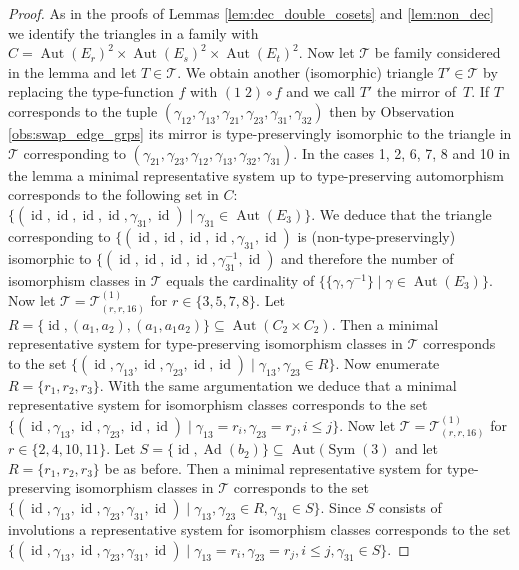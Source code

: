 \documentclass[dvipsnames]{article}
\theoremstyle{definition}
\theoremstyle{remark}
\DeclareMathOperator{\Sym}{Sym}
\DeclareMathOperator{\Aut}{Aut}
\DeclareMathOperator{\id}{id}
\DeclareMathOperator{\Ad}{Ad}
\begin{document}
    \begin{proof}
        As in the proofs of Lemmas \ref{lem:dec_double_cosets} and \ref{lem:non_dec} we identify the triangles in a family with
        $C = \Aut(E_r)^2 \times \Aut(E_s)^2 \times \Aut(E_t)^2$. 
        Now let $\mathcal T$ be family considered in the lemma and let $T \in \mathcal T$.
        We obtain another (isomorphic) triangle $T' \in \mathcal T$ by replacing the type-function $f$ with $(1\;2)\circ f$ and we call $T'$ the mirror of~$T$. 
        If $T$ corresponds to the tuple $(\gamma_{12},\allowbreak \gamma_{13},\allowbreak \gamma_{21},\allowbreak \gamma_{23},\allowbreak \gamma_{31},\allowbreak \gamma_{32})$ then by Observation \ref{obs:swap_edge_grps} its mirror is type-preservingly isomorphic to the triangle in $\mathcal T$ corresponding to $(\gamma_{21},\allowbreak \gamma_{23},\allowbreak \gamma_{12},\allowbreak \gamma_{13},\allowbreak \gamma_{32},\allowbreak \gamma_{31})$.
        In the cases 1, 2, 6, 7, 8 and 10 in the lemma a minimal representative system up to type-preserving automorphism corresponds to the following set in $C$: 
        $\{(\id,\id,\id,\id,\gamma_{31},\id) \mid \gamma_{31} \in \Aut(E_3)\}$.
        We deduce that the triangle corresponding to $\{(\id,\id,\id,\id,\gamma_{31},\id)$ is (non-type-preservingly) isomorphic to $\{(\id,\id,\id,\id,\gamma_{31}^{-1},\id)$ and therefore the number of isomorphism classes in $\mathcal T$ equals the cardinality of $\{\{\gamma, \gamma^{-1}\} \mid \gamma \in \Aut(E_3)\}$.
        Now let $\mathcal T = \mathcal T^{(1)}_{(r,r,16)}$ for $r \in \{3,5,7,8\}$. Let $R = \{\id, (a_1, a_2), (a_1, a_1a_2)\} \subseteq \Aut(C_2\times C_2)$. Then a minimal representative system for type-preserving isomorphism classes in $\mathcal T$ corresponds to the set
        $\{(\id,\gamma_{13},\id,\gamma_{23},\id,\id) \mid \gamma_{13}, \gamma_{23} \in R\}$.
        Now enumerate $R = \{r_1, r_2, r_3\}$. With the same argumentation we deduce that a minimal representative system for isomorphism classes corresponds to the set $\{(\id,\gamma_{13},\id,\gamma_{23},\id,\id) \mid \gamma_{13} = r_i, \gamma_{23} = r_j, i \leq j\}$.
        Now let $\mathcal T = \mathcal T^{(1)}_{(r,r,16)}$ for $r \in \{2,4,10,11\}$. Let $S = \{\id, \Ad(b_2)\} \subseteq \Aut(\Sym(3)$ and let $R = \{r_1, r_2, r_3\}$ be as before.
        Then a minimal representative system for type-preserving isomorphism classes in $\mathcal T$ corresponds to the set
        $\{(\id,\gamma_{13},\id,\gamma_{23},\gamma_{31},\id) \mid \gamma_{13}, \gamma_{23} \in R, \gamma_{31} \in S\}$. Since $S$ consists of involutions a representative system for isomorphism classes corresponds to the set $\{(\id,\gamma_{13},\id,\gamma_{23}, \gamma_{31},\id) \mid \gamma_{13} = r_i, \gamma_{23} = r_j, i \leq j, \gamma_{31} \in S\}$.

\end{proof}
\end{document}
